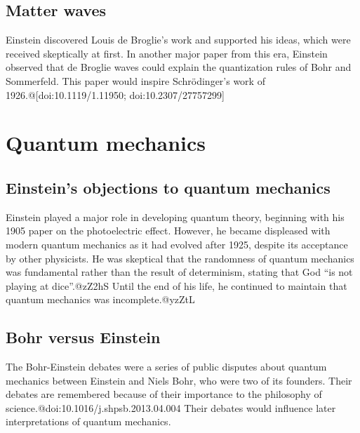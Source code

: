 \documentclass[twoside]{memoir}
\begin{document}
\section{Matter waves}
Einstein discovered Louis de Broglie's work and supported his ideas, which were received skeptically at first. In another major paper from this era, Einstein observed that de Broglie waves could explain the quantization rules of Bohr and Sommerfeld. This paper would inspire Schrödinger's work of 1926.@[doi:10.1119/1.11950; doi:10.2307/27757299]
\chapter{Quantum mechanics}
\section{Einstein's objections to quantum mechanics}
Einstein played a major role in developing quantum theory, beginning with his 1905 paper on the photoelectric effect. However, he became displeased with modern quantum mechanics as it had evolved after 1925, despite its acceptance by other physicists. He was skeptical that the randomness of quantum mechanics was fundamental rather than the result of determinism, stating that God \enquote{is not playing at dice}.@zZ2hS Until the end of his life, he continued to maintain that quantum mechanics was incomplete.@yzZtL
\section{Bohr versus Einstein}
The Bohr-Einstein debates were a series of public disputes about quantum mechanics between Einstein and Niels Bohr, who were two of its founders. Their debates are remembered because of their importance to the philosophy of science.@doi:10.1016/j.shpsb.2013.04.004 Their debates would influence later interpretations of quantum mechanics.
\end{document}
